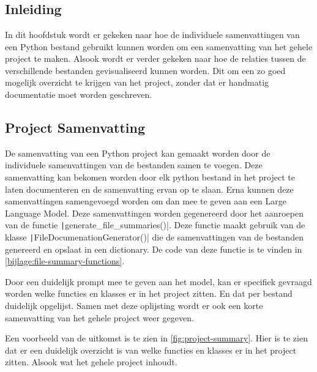 
\chapter{}
\label{ch:project-documentatie}

\section{Inleiding}
\label{sec:project-documentatie-inleiding}

In dit hoofdstuk wordt er gekeken naar hoe de individuele samenvattingen van een Python bestand gebruikt kunnen worden om een samenvatting van het gehele project te maken.
Alsook wordt er verder gekeken naar hoe de relaties tussen de verschillende bestanden gevisualiseerd kunnen worden.
Dit om een zo goed mogelijk overzicht te krijgen van het project, zonder dat er handmatig documentatie moet worden geschreven.

\section{Project Samenvatting}
\label{sec:project-documentatie-samenvatting}

De samenvatting van een Python project kan gemaakt worden door de individuele samenvattingen van de bestanden samen te voegen.
Deze samenvatting kan bekomen worden door elk python bestand in het project te laten documenteren en de samenvatting ervan op te slaan.
Erna kunnen deze samenvattingen samengevoegd worden om dan mee te geven aan een Large Language Model.
Deze samenvattingen worden gegenereerd door het aanroepen van de functie \texttt|generate_file_summaries()|. 
Deze functie maakt gebruik van de klasse \texttt|FileDocumenationGenerator()| die de samenvattingen van de bestanden genereerd en opslaat in een dictionary.
De code van deze functie is te vinden in \ref{bijlage:file-summary-functions}.  

Door een duidelijk prompt mee te geven aan het model, kan er specifiek gevraagd worden welke functies en klasses er in het project zitten.
En dat per bestand duidelijk opgelijst. Samen met deze oplijsting wordt er ook een korte samenvatting van het gehele project weer gegeven.

Een voorbeeld van de uitkomst is te zien in \ref{fig:project-summary}.
Hier is te zien dat er een duidelijk overzicht is van welke functies en klasses er in het project zitten.
Alsook wat het gehele project inhoudt.

